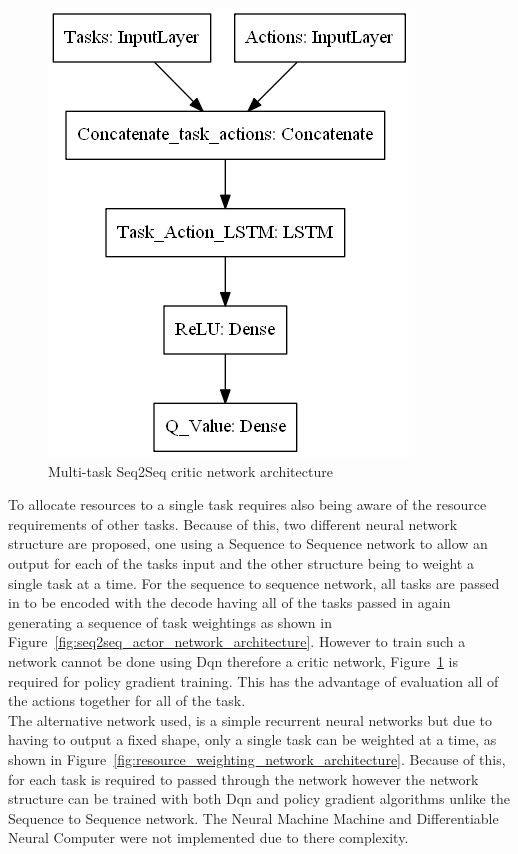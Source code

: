 \begin{figure}[H]
\begin{minipage}{0.55\linewidth}
        \includegraphics[width=\linewidth]{figures/3_solution_figs/single_task_critic_weighting_network_architecture.png}
        \caption{Multi-task Seq2Seq critic network architecture}
        \label{fig:seq2seq_critic_network_architecture}
    \end{minipage}
\end{figure}

To allocate resources to a single task requires also being aware of the resource requirements of other tasks. Because
of this, two different neural network structure are proposed, one using a Sequence to Sequence network to allow
an output for each of the tasks input and the other structure being to weight a single task at a time. For the sequence
to sequence network, all tasks are passed in to be encoded with the decode having all of the tasks passed in again
generating a sequence of task weightings as shown in Figure~\ref{fig:seq2seq_actor_network_architecture}. However to
train such a network cannot be done using Dqn therefore a critic network,
Figure~\ref{fig:seq2seq_critic_network_architecture} is required for policy gradient training. This has the advantage of
evaluation all of the actions together for all of the task. \\
The alternative network used, is a simple recurrent neural networks but due to having to output a fixed shape, only a
single task can be weighted at a time, as shown in Figure~\ref{fig:resource_weighting_network_architecture}. Because of
this, for each task is required to passed through the network however the network structure can be trained with both
Dqn and policy gradient algorithms unlike the Sequence to Sequence network. The Neural Machine Machine and
Differentiable Neural Computer were not implemented due to there complexity.

